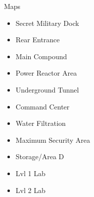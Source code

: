\begin{maps}{Maps}
    \begin{itemize}
        \item Secret Military Dock
        \item Rear Entrance
        \item Main Compound
        \item Power Reactor Area
        \item Underground Tunnel
        \item Command Center
        \item Water Filtration
        \item Maximum Security Area
        \item Storage/Area D
        \item Lvl 1 Lab
        \item Lvl 2 Lab
    \end{itemize}
\end{maps}
